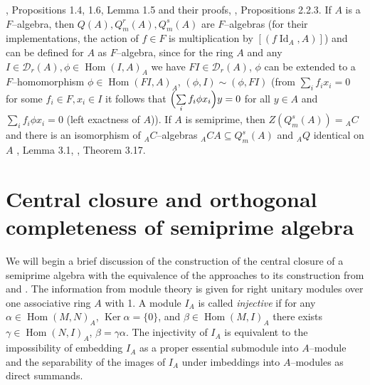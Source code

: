 \documentclass[a4paper,11pt]{article}
\DeclareMathOperator{\Id}{Id}
\DeclareMathOperator{\Ker}{Ker}
\DeclareMathOperator{\Hom}{Hom}
\begin{document}
\cite{Pas}, Propositions 1.4, 1.6, Lemma 1.5 and their proofs, 
\cite{BMM}, Propositions 2.2.3. If $A$ is a $F$--algebra, then  
${Q(A), Q^r_m(A), Q^s_m(A)}$ are $F$--algebras (for their implementations, 
the action of ${f\in F}$ is multiplication by ${[(f \Id_A, A)]}$) and 
can be defined for $A$ as $F$--algebra, since for the ring $A$ and any 
${I\in \mathcal{D}_r(A), \phi\in \Hom(I, A)_A}$ we have 
${F I\in \mathcal{D}_r(A)}$, $\phi$ can be extended to a $F$--homomorphism 
${\phi\in \Hom(F I, A)_A}$, ${(\phi, I)\sim (\phi, F I)}$ 
(from ${\sum\limits_i f_i x_i=0}$ for some ${f_i\in F, x_i\in I}$ it follows 
that ${\Bigl(\sum\limits_i f_i \phi x_i\Bigr) y=0}$ for all ${y\in A}$ and 
${\sum\limits_i f_i \phi x_i=0}$ (left exactness of $A$)). 
If $A$ is semiprime, then ${Z(Q^s_m(A))={}_A C}$ and there is an isomorphism 
of ${}_A C$--algebras ${{}_A C A\subseteq Q^s_m(A)}$ and ${}_A Q$ 
identical on $A$ \cite{BM1}, Lemma 3.1, \cite{BM}, Theorem 3.17. 

\section{Central closure and orthogonal completeness of semiprime 
algebra}

We will begin a brief discussion of the construction of the central closure 
of a semiprime algebra with the equivalence of the approaches to its 
construction from \cite{EMO, BM, BMM} and \cite{Raz, Wis}. The information 
from module theory is given for right unitary modules over one associative 
ring $A$ with 1. A module $I_A$ is called \emph{injective} if for any 
${\alpha\in \Hom(M, N)_A}$, ${\Ker \alpha=\{0\}}$, and 
${\beta\in \Hom(M, I)_A}$ there exists ${\gamma\in \Hom(N, I)_A}$, 
${\beta=\gamma \alpha}$. The injectivity of $I_A$ is equivalent to the 
impossibility of embedding $I_A$ as a proper essential submodule into 
$A$--module and the separability of the images of $I_A$ under 
imbeddings into $A$--modules as direct summands. 
\end{document}
